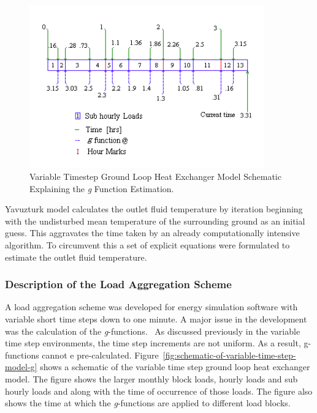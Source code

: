 \begin{figure}[hbtp] %
\centering
\includegraphics[width=0.9\textwidth, height=0.9\textheight, keepaspectratio=true]{media/image5655.png}
\caption{Variable Timestep Ground Loop Heat Exchanger Model Schematic Explaining the \emph{g} Function Estimation. \protect \label{fig:variable-timestep-ground-loop-heat-exchanger}}
\end{figure}

Yavuzturk model calculates the outlet fluid temperature by iteration beginning with the undisturbed mean temperature of the surrounding ground as an initial guess. This aggravates the time taken by an already computationally intensive algorithm. To circumvent this a set of explicit equations were formulated to estimate the outlet fluid temperature.

\subsubsection{Description of the Load Aggregation Scheme}\label{description-of-the-load-aggregation-scheme}

A load aggregation scheme was developed for energy simulation software with variable short time steps down to one minute. A major issue in the development was the calculation of the \emph{g}-functions.~ As discussed previously in the variable time step environments, the time step increments are not uniform. As a result, g-functions cannot e pre-calculated. Figure~\ref{fig:schematic-of-variable-time-step-model-g} shows a schematic of the variable time step ground loop heat exchanger model. The figure shows the larger monthly block loads, hourly loads and sub hourly loads and along with the time of occurrence of those loads. The figure also shows the time at which the \emph{g}-functions are applied to different load blocks.

